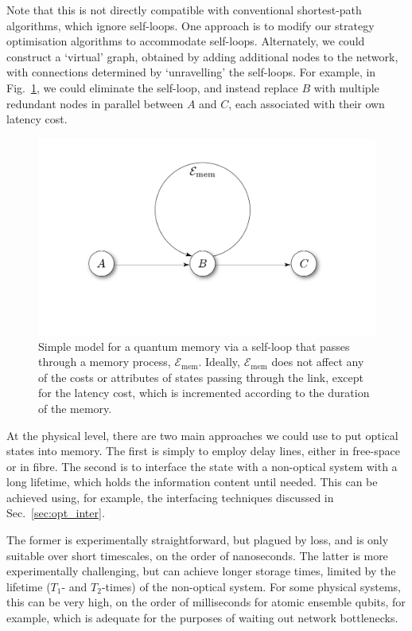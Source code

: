 \documentclass[aps,rmp,twocolumn,amsmath,amssymb,nofootinbib,superscriptaddress]{revtex4}
\begin{document}
Note that this is not directly compatible with conventional shortest-path algorithms, which ignore self-loops. One approach is to modify our strategy optimisation algorithms to accommodate self-loops. Alternately, we could construct a `virtual' graph, obtained by adding additional nodes to the network, with connections determined by `unravelling' the self-loops. For example, in Fig.~\ref{fig:memory}, we could eliminate the self-loop, and instead replace $B$ with multiple redundant nodes in parallel between $A$ and $C$, each associated with their own latency cost.

\begin{figure}[!htb]
\includegraphics[width=0.7\columnwidth]{memory}
\caption{Simple model for a quantum memory via a self-loop that passes through a memory process, $\mathcal{E}_\mathrm{mem}$. Ideally, $\mathcal{E}_\mathrm{mem}$ does not affect any of the costs or attributes of states passing through the link, except for the latency cost, which is incremented according to the duration of the memory.} \label{fig:memory}
\end{figure}

At the physical level, there are two main approaches we could use to put optical states into memory. The first is simply to employ delay lines, either in free-space or in fibre. The second is to interface the state with a non-optical system with a long lifetime, which holds the information content until needed. This can be achieved using, for example, the interfacing techniques discussed in Sec.~\ref{sec:opt_inter}.

The former is experimentally straightforward, but plagued by loss, and is only suitable over short timescales, on the order of nanoseconds. The latter is more experimentally challenging, but can achieve longer storage times, limited by the lifetime ($T_1$- and $T_2$-times) of the non-optical system. For some physical systems, this can be very high, on the order of milliseconds for atomic ensemble qubits, for example, which is adequate for the purposes of waiting out network bottlenecks.
\end{document}
